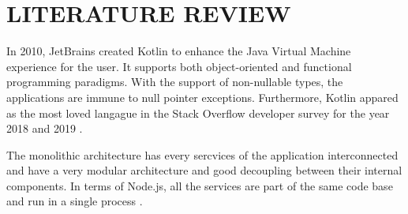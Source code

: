 \chapter{LITERATURE REVIEW}

In 2010, JetBrains created Kotlin to enhance the Java Virtual Machine experience for the user. It supports both object-oriented and functional programming paradigms. With the support of non-nullable types, the applications are immune to null pointer exceptions. Furthermore, Kotlin appared as the most loved langague in the Stack Overflow developer survey for the year 2018 and 2019 \cite{oliveira2020adoption}.

The monolithic architecture has every sercvices of the application interconnected and have a very modular architecture and good decoupling between their internal components. In terms of Node.js, all the services are part of the same code base and run in a single process \cite{casciaro2020nodejs}. 